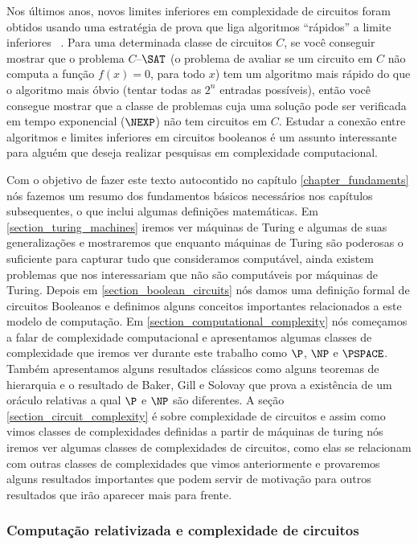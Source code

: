 Nos últimos anos, novos limites inferiores em complexidade de circuitos foram obtidos usando uma estratégia de prova que liga algoritmos ``rápidos''  a limite inferiores ~\cite{RW1, RW2}.  Para uma determinada classe de circuitos $C$, se você conseguir mostrar que o problema $C$--$\SAT$ (o problema de avaliar se um circuito em $C$ não computa a função $f(x) = 0$, para todo $x$) tem um algoritmo mais rápido do que o algoritmo mais óbvio (tentar todas as $2^n$ entradas possíveis), então você consegue mostrar que a classe de problemas cuja uma solução pode ser verificada em tempo exponencial ($\NEXP$) não tem circuitos em $C$. Estudar a conexão entre algoritmos e limites inferiores em circuitos booleanos é um assunto interessante para alguém que deseja realizar pesquisas em complexidade computacional.

Com o objetivo de fazer este texto autocontido no capítulo \ref{chapter_fundaments} nós fazemos um resumo dos fundamentos básicos necessários nos capítulos subsequentes, o que inclui algumas definições matemáticas. Em \ref{section_turing_machines} iremos ver máquinas de Turing e algumas de suas generalizações e mostraremos que enquanto máquinas de Turing são poderosas o suficiente para capturar tudo que consideramos computável, ainda existem problemas que nos interessariam que não são computáveis por máquinas de Turing. Depois em \ref{section_boolean_circuits} nós damos uma definição formal de circuitos Booleanos e definimos alguns conceitos importantes relacionados a este modelo de computação. Em \ref{section_computational_complexity} nós começamos a falar de complexidade computacional e apresentamos algumas classes de complexidade que iremos ver durante este trabalho como $\P$, $\NP$ e $\PSPACE$. Também apresentamos alguns resultados clássicos como alguns teoremas de hierarquia e o resultado de Baker, Gill e Solovay que prova a existência de um oráculo relativas a qual $\P$ e $\NP$ são diferentes. A seção \ref{section_circuit_complexity} é sobre complexidade de circuitos e assim como vimos classes de complexidades definidas a partir de máquinas de turing nós iremos ver algumas classes de complexidades de circuitos, como elas se relacionam com outras classes de complexidades que vimos anteriormente e provaremos alguns resultados importantes que podem servir de motivação para outros resultados que irão aparecer mais para frente.

\subsubsection{Computação relativizada e complexidade de circuitos}

